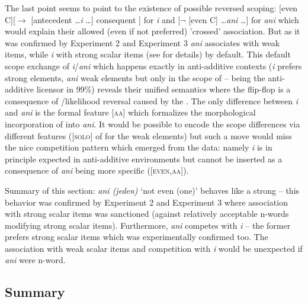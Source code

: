 \documentclass[output=paper, colorlinks, citecolor=brown, newtxmath]{langsci/langscibook}
\begin{document}
\noindent The last point seems to point to the existence of possible reversed scoping: [even C][$\rightarrow$ [antecedent \ldots \textit{i} \ldots] consequent ] for \textit{i} and  [$\neg$ [even C] \ldots \textit{ani} \ldots] for \textit{ani} which would explain their allowed (even if not preferred) 'crossed' association. But as it was confirmed by Experiment 2 and Experiment 3 \textit{ani} associates with weak items, while \textit{i} with strong scalar items (see \citealt{docekalsafratovaoli} for details) by default. This default scope exchange of \textit{i}/\textit{ani} which happens exactly in anti-additive contexts (\textit{i} prefers strong elements, \textit{ani} weak elements but only in the scope of  --  being the anti-additive licensor in 99\%) reveals their unified semantics where the flip-flop is a consequence of /likelihood reversal caused by the . The only difference between \textit{i} and \textit{ani} is the formal feature [\textsc{aa}] which formalizes the morphological incorporation of  into \textit{ani}.  It would be possible to encode the scope differences via different features ([\textsc{solo}] of \citealt{crnic2011getting} for the weak elements) but such a move would miss the nice competition pattern which emerged from the data: namely \textit{i} is in principle expected in anti-additive environments but cannot be inserted as a consequence of \textit{ani} being more specific ([\textsc{even,aa}]).

Summary of this section: \textit{ani (jeden)} `not even (one)' behaves like a strong  -- this behavior was confirmed by Experiment 2 and Experiment 3 where association with strong scalar items was sanctioned (against relatively acceptable n-words modifying strong scalar items). Furthermore, \textit{ani} competes with \textit{i} -- the former prefers strong scalar items which was experimentally confirmed too. The association with weak scalar items and competition with \textit{i} would be unexpected if \textit{ani} were n-word.

\subsection{Summary}\label{summary}
\end{document}
